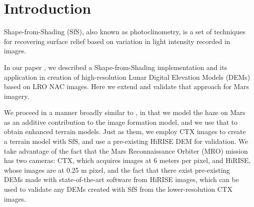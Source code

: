 \documentclass[draft,linenumbers]{agujournal}
\begin{document}
%
%
%
%

\section{Introduction}

Shape-from-Shading (SfS), also known as photoclinometry, is a set of
techniques for recovering surface relief based on variation in light
intensity recorded in images. 

In our paper \cite{alexandrovmulti}, we described a Shape-from-Shading implementation
and its application in creation of high-resolution Lunar Digital Elevation Models (DEMs) based on LRO NAC
images. Here we extend and validate that approach for Mars imagery. 

We proceed in a manner broadly similar to \citep{wohlfarth2018high}, in that we model the haze on Mars as an additive contribution to the image formation model, and we use that to obtain enhanced terrain models. Just as them, we employ CTX images to create a terrain model with SfS, and use a pre-existing HiRISE DEM for validation. We take advantage of the fact that the Mars Reconnaissance Orbiter (MRO) mission has two cameras: CTX, which acquires images at 6 meters per pixel, and HiRISE, whose images are at 0.25 m pixel, and the fact that there exist pre-existing DEMs made with state-of-the-art software from HiRISE images, which can be used to validate any DEMs created with SfS from the lower-resolution CTX images.   
\end{document}
